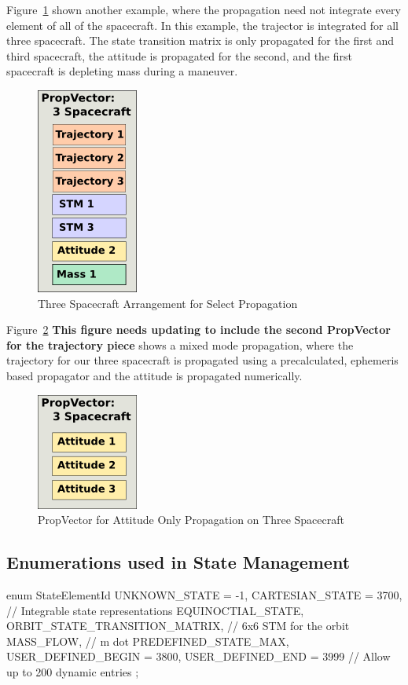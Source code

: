 Figure~\ref{figure:SelectPropVector} shown another example, where the propagation need not
integrate every element of all of the spacecraft.  In this example, the trajector is integrated for
all three spacecraft.  The state transition matrix is only propagated for the first and third
spacecraft, the attitude is propagated for the second, and the first spacecraft is depleting mass
during a maneuver.

\begin{figure}[htb]
\begin{center}
\includegraphics[63,129]{Images/ThreeSatActivePropVector.png}
\caption{\label{figure:SelectPropVector}Three Spacecraft Arrangement for Select
Propagation}
\end{center}
\end{figure}

Figure~\ref{figure:AttitudePropVector} \textbf{This figure needs updating to include the second
PropVector for the trajectory piece} shows a mixed mode propagation, where the trajectory for our
three spacecraft is propagated using a precalculated, ephemeris based propagator and the attitude is
propagated numerically.

\begin{figure}[htb]
\begin{center}
\includegraphics[63,73]{Images/ThreeSatAttitudePropVector.png}
\caption{\label{figure:AttitudePropVector}PropVector for Attitude Only Propagation on Three
Spacecraft}
\end{center}
\end{figure}


\subsection{Enumerations used in State Management}

   enum StateElementId
   {
      UNKNOWN\_STATE = -1,
      CARTESIAN\_STATE = 3700,          // Integrable state representations
      EQUINOCTIAL\_STATE,
      ORBIT\_STATE\_TRANSITION\_MATRIX,   // 6x6 STM for the orbit
      MASS\_FLOW,                       // m dot
      PREDEFINED\_STATE\_MAX,
      USER\_DEFINED\_BEGIN = 3800,
      USER\_DEFINED\_END = 3999          // Allow up to 200 dynamic entries
   };
